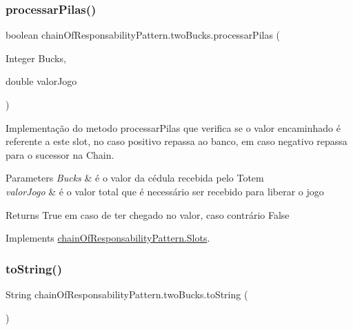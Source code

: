 \subsubsection{\texorpdfstring{processarPilas()}{processarPilas()}}
{\footnotesize\ttfamily boolean chain\+Of\+Responsability\+Pattern.\+two\+Bucks.\+processar\+Pilas (\begin{DoxyParamCaption}\item[{Integer}]{Bucks,  }\item[{double}]{valor\+Jogo }\end{DoxyParamCaption})}



Implementação do metodo processar\+Pilas que verifica se o valor encaminhado é referente a este slot, no caso positivo repassa ao banco, em caso negativo repassa para o sucessor na Chain. 


\begin{DoxyParams}{Parameters}
{\em Bucks} & é o valor da cédula recebida pelo Totem \\
\hline
{\em valor\+Jogo} & é o valor total que é necessário ser recebido para liberar o jogo \\
\hline
\end{DoxyParams}
\begin{DoxyReturn}{Returns}
True em caso de ter chegado no valor, caso contrário False 
\end{DoxyReturn}


Implements \mbox{\hyperlink{interfacechain_of_responsability_pattern_1_1_slots_ade54039583c4faf4126847fe7c143862}{chain\+Of\+Responsability\+Pattern.\+Slots}}.

\mbox{\label{classchain_of_responsability_pattern_1_1two_bucks_afc5049ee6a7d925bc945d717d2be8d19}} 
\subsubsection{\texorpdfstring{toString()}{toString()}}
{\footnotesize\ttfamily String chain\+Of\+Responsability\+Pattern.\+two\+Bucks.\+to\+String (\begin{DoxyParamCaption}{ }\end{DoxyParamCaption})}



